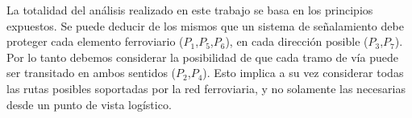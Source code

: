     La totalidad del análisis realizado en este trabajo se basa en los principios expuestos. Se puede deducir de los mismos que un sistema de señalamiento debe proteger cada elemento ferroviario ($P_1$,$P_5$,$P_6$), en cada dirección posible ($P_3$,$P_7$). Por lo tanto debemos considerar la posibilidad de que cada tramo de vía puede ser transitado en ambos sentidos ($P_2$,$P_4$). Esto implica a su vez considerar todas las rutas posibles soportadas por la red ferroviaria, y no solamente las necesarias desde un punto de vista logístico.